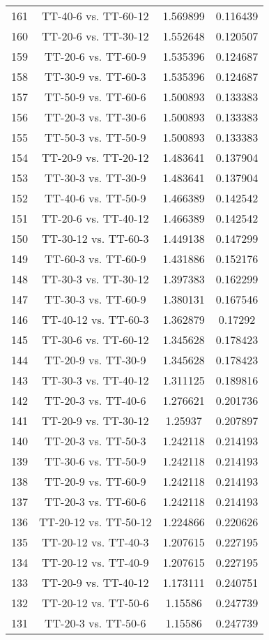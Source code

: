 \documentclass[a4paper,10pt]{article}
\begin{document}
\begin{landscape}
\begin{table}[!htp]
\begin{tabular}{cccc}
161&TT-40-6 vs. TT-60-12&1.569899&0.116439\\
160&TT-20-6 vs. TT-30-12&1.552648&0.120507\\
159&TT-20-6 vs. TT-60-9&1.535396&0.124687\\
158&TT-30-9 vs. TT-60-3&1.535396&0.124687\\
157&TT-50-9 vs. TT-60-6&1.500893&0.133383\\
156&TT-20-3 vs. TT-30-6&1.500893&0.133383\\
155&TT-50-3 vs. TT-50-9&1.500893&0.133383\\
154&TT-20-9 vs. TT-20-12&1.483641&0.137904\\
153&TT-30-3 vs. TT-30-9&1.483641&0.137904\\
152&TT-40-6 vs. TT-50-9&1.466389&0.142542\\
151&TT-20-6 vs. TT-40-12&1.466389&0.142542\\
150&TT-30-12 vs. TT-60-3&1.449138&0.147299\\
149&TT-60-3 vs. TT-60-9&1.431886&0.152176\\
148&TT-30-3 vs. TT-30-12&1.397383&0.162299\\
147&TT-30-3 vs. TT-60-9&1.380131&0.167546\\
146&TT-40-12 vs. TT-60-3&1.362879&0.17292\\
145&TT-30-6 vs. TT-60-12&1.345628&0.178423\\
144&TT-20-9 vs. TT-30-9&1.345628&0.178423\\
143&TT-30-3 vs. TT-40-12&1.311125&0.189816\\
142&TT-20-3 vs. TT-40-6&1.276621&0.201736\\
141&TT-20-9 vs. TT-30-12&1.25937&0.207897\\
140&TT-20-3 vs. TT-50-3&1.242118&0.214193\\
139&TT-30-6 vs. TT-50-9&1.242118&0.214193\\
138&TT-20-9 vs. TT-60-9&1.242118&0.214193\\
137&TT-20-3 vs. TT-60-6&1.242118&0.214193\\
136&TT-20-12 vs. TT-50-12&1.224866&0.220626\\
135&TT-20-12 vs. TT-40-3&1.207615&0.227195\\
134&TT-20-12 vs. TT-40-9&1.207615&0.227195\\
133&TT-20-9 vs. TT-40-12&1.173111&0.240751\\
132&TT-20-12 vs. TT-50-6&1.15586&0.247739\\
131&TT-20-3 vs. TT-50-6&1.15586&0.247739\\

\end{tabular}
\end{table}
\end{landscape}
\end{document}
